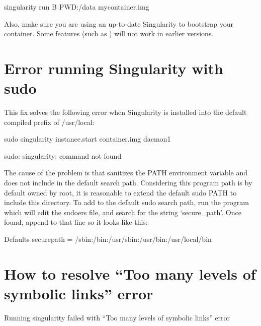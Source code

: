 \documentclass[letterpaper,10pt,english]{sphinxmanual}
\begin{document}
%
\begin{sphinxVerbatim}[commandchars=\\\{\}]
\PYGZdl{} singularity run \PYGZhy{}B \PYGZdl{}PWD:/data my\PYGZus{}container.img
\end{sphinxVerbatim}

Also, make sure you are using an up-to-date Singularity to bootstrap
your container. Some features (such as  ) will not work in earlier
versions.


\section{Error running Singularity with sudo}
\label{\detokenize{troubleshooting:error-running-singularity-with-sudo}}
This fix solves the following error when Singularity is installed into
the default compiled prefix of /usr/local:

%
\begin{sphinxVerbatim}[commandchars=\\\{\}]
\PYGZdl{} sudo singularity instance.start container.img daemon1

sudo: singularity: command not found
\end{sphinxVerbatim}

The cause of the problem is that  sanitizes the PATH environment
variable and does not include  in the default search
path. Considering this program path is by default owned by root, it is
reasonable to extend the default sudo PATH to include this directory.
To add  to the default sudo search path, run the program
 which will edit the sudoers file, and search for the string
‘secure\_path’. Once found, append  to that line so it
looks like this:

%
\begin{sphinxVerbatim}[commandchars=\\\{\}]
Defaults    secure\PYGZus{}path = /sbin:/bin:/usr/sbin:/usr/bin:/usr/local/bin
\end{sphinxVerbatim}


\section{How to resolve “Too many levels of symbolic links” error}
\label{\detokenize{troubleshooting:how-to-resolve-too-many-levels-of-symbolic-links-error}}
Running singularity failed with “Too many levels of symbolic links”
error
\end{document}
